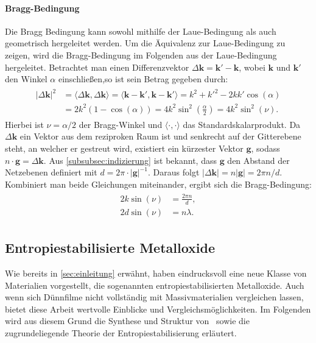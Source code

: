 \paragraph{Bragg-Bedingung}
Die Bragg Bedingung kann sowohl mithilfe der Laue-Bedingung als auch geometrisch hergeleitet werden.
Um die Äquivalenz zur Laue-Bedingung zu zeigen, wird die Bragg-Bedingung im Folgenden aus der Laue-Bedingung
hergeleitet.
Betrachtet man einen Differenzvektor $\Delta \mathbf{k}=\mathbf{k}'-\mathbf{k}$, wobei $\mathbf{k}$ und
$\mathbf{k'}$ den Winkel $\alpha$ einschließen,so ist sein Betrag gegeben durch:
\begin{align}
    \begin{split}
        \lvert \Delta \mathbf{k} \rvert ^{2}&=\langle \Delta \mathbf{k} ,\Delta \mathbf{k}\rangle =\langle
        \mathbf{k}-\mathbf{k}', \mathbf{k}-\mathbf{k}' \rangle = k^{2}+k'^{2}-2kk'\cos(\alpha)  \\
        &=2{k}^{2}(1-\cos(\alpha))=4k^{2}\sin ^{2}\left( \frac{\alpha}{2} \right)
        =4k^{2}\sin ^{2}( \nu).
    \end{split}
\end{align}
Hierbei ist $\nu = \alpha / 2$ der Bragg-Winkel und $\langle \cdot , \cdot \rangle$ das Standardskalarprodukt.
Da $\Delta \mathbf{k}$ ein Vektor aus dem reziproken Raum ist und senkrecht auf der Gitterebene
steht, an welcher er gestreut wird, existiert ein kürzester Vektor $\mathbf{g}$, sodass
$n\cdot \mathbf{g} =\Delta \mathbf{k}$.
Aus \cref{subsubsec:indizierung} ist bekannt, dass $\mathbf{g}$ den Abstand der Netzebenen definiert
mit $d = 2 \pi \cdot\lvert \mathbf{g} \rvert ^{-1}$.
Daraus folgt $\lvert \Delta \mathbf{k} \rvert=n \lvert \mathbf{g} \rvert = 2\pi n/d$.
Kombiniert man beide Gleichungen miteinander, ergibt sich die Bragg-Bedingung:\autocite[125-126]{Ashcroft}
\begin{align}
    \begin{split}
        2k\sin(\nu)&=\frac{2\pi n}{d}, \\
        2d\sin(\nu)&=n \lambda.
    \end{split}
\end{align}

\subsection{Entropiestabilisierte Metalloxide}\label{subsec:hochentropische-metalloxide}
Wie bereits in \cref{sec:einleitung} erwähnt, haben  eindrucksvoll eine neue Klasse von
Materialien vorgestellt, die sogenannten entropiestabilisierten Metalloxide.
Auch wenn sich Dünnfilme nicht vollständig mit Massivmaterialien vergleichen lassen, bietet diese Arbeit
wertvolle Einblicke und Vergleichsmöglichkeiten.
Im Folgenden wird aus diesem Grund die Synthese und Struktur von \heo\, sowie die zugrundeliegende Theorie
der Entropiestabilisierung erläutert.

